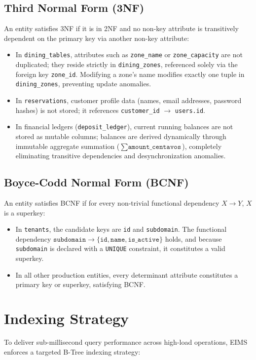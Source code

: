\subsection{Third Normal Form (3NF)}
An entity satisfies 3NF if it is in 2NF and no non-key attribute is transitively dependent on the primary key via another non-key attribute:
\begin{itemize}
    \item In \texttt{dining\_tables}, attributes such as \texttt{zone\_name} or \texttt{zone\_capacity} are not duplicated; they reside strictly in \texttt{dining\_zones}, referenced solely via the foreign key \texttt{zone\_id}. Modifying a zone's name modifies exactly one tuple in \texttt{dining\_zones}, preventing update anomalies.
    \item In \texttt{reservations}, customer profile data (names, email addresses, password hashes) is not stored; it references \texttt{customer\_id} $\to$ \texttt{users.id}.
    \item In financial ledgers (\texttt{deposit\_ledger}), current running balances are not stored as mutable columns; balances are derived dynamically through immutable aggregate summation ($\sum \texttt{amount\_centavos}$), completely eliminating transitive dependencies and desynchronization anomalies.
\end{itemize}

\subsection{Boyce-Codd Normal Form (BCNF)}
An entity satisfies BCNF if for every non-trivial functional dependency $X \to Y$, $X$ is a superkey:
\begin{itemize}
    \item In \texttt{tenants}, the candidate keys are \texttt{id} and \texttt{subdomain}. The functional dependency $\texttt{subdomain} \to \{\texttt{id}, \texttt{name}, \texttt{is\_active}\}$ holds, and because \texttt{subdomain} is declared with a \texttt{UNIQUE} constraint, it constitutes a valid superkey.
    \item In all other production entities, every determinant attribute constitutes a primary key or superkey, satisfying BCNF.
\end{itemize}

\section{Indexing Strategy}
\label{sec:db_indexing}
To deliver sub-millisecond query performance across high-load operations, EIMS enforces a targeted B-Tree indexing strategy:

